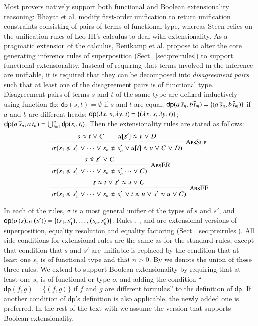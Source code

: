 Most provers natively support both functional and Boolean extensionality
reasoning: Bhayat et al. \cite{br-20-full-sup-w-combs} modify first-order
unification to return unification constraints consisting of pairs of terms of
functional type, whereas Steen relies on the unification rules of Leo-III's
calculus \cite[Section 4.3.3]{as-18-phd} to deal with extensionality. As a
pragmatic extension of the \lsup{} calculus, Bentkamp et al.
\cite{bbtvw-21-sup-lam} propose to alter the core generating inference rules of
superposition (Sect.~\ref{sec:pre:rules}) to support functional extensionality.
Instead of requiring that terms involved in the inference are unifiable, it is
required that they can be decomposed into \emph{disagreement pairs} such that at
least one of the disagreement pairs is of functional type. Disagreement pairs of
terms $s$ and $t$ of the same type are defined inductively using function
$\textsf{dp}$: $\textsf{dp}(s,t) = \emptyset$ if $s$ and $t$ are equal;
$\textsf{dp}(a \, \overline{s}_{n}, b \, \overline{t}_{m}) = \{(a \, \overline{s}_{n}, b \,
\overline{t}_{m})\}$ if $a$ and $b$ are different heads; $\textsf{dp}(\lambda x.\> s,
\lambda y.\> t) = \{ (\lambda x.\> s, \lambda y.\> t) \}$; $\textsf{dp}(a \, \overline{s}_{n}, a
\, \overline{t}_{n}) = \bigcup_{i=1}^{n} \textsf{dp}(s_i, t_i)$. Then the
extensionality rules are stated as follows:
\pagebreak[2]
\begin{align*}
  & \namedinference{AbsSup}
  {s \eq t \llor C \qquad u[s'] \mathrel{\dot{\eq}} v \llor D}
  {\sigmacl{s_1 \noteq s'_1 \llor \cdots \llor s_n \noteq s'_n \llor  u[t] \mathrel{\dot{\eq}} v \llor C \llor D}} \\
  &\namedinference{AbsER}{s \noteq s' \llor C}{\sigmacl{s_1 \noteq s'_1 \llor \cdots \llor s_n \noteq s'_n \cdots \llor  C}} \\
  &\namedinference{AbsEF}{s \eq t \llor  s' \eq u \llor C}{\sigmacl{s_1 \noteq s'_1 \llor \cdots \llor s_n \noteq s'_n \llor t \noteq u \llor  s' \eq u \llor C}}
\end{align*}

\noindent{}
In each of the rules, $\sigma$ is a most general unifier of the types of $s$ and
$s'$, and $\textsf{dp}(\sigma(s) ,\sigma(s')) = \{ (s_1, s'_1), \ldots,
(s_n, s'_n)\}$. Rules , , and  are
extensional versions of superposition, equality resolution and equality
factoring (Sect.~\ref{sec:pre:rules}). All side conditions for extensional rules are the same as for
the standard rules, except that condition that $s$ and $s'$ are unifiable is
replaced by the condition that at least one $s_i$ is of functional type and that
$n>0$. By  we denote the union of
these three rules. We extend  to support Boolean extensionality by
requiring that at least one $s_i$ is of functional or type $o$, and adding the
condition ``$\textsf{dp}(f, g) = \{(f,g)\}$ if $f$ and $g$ are different
formulas'' to the definition of $\textsf{dp}$. If another condition of \textsf{dp}'s 
definition is also applicable, the newly added one is preferred. In the rest of the
text with  we assume the version that supports Boolean extensionality.

